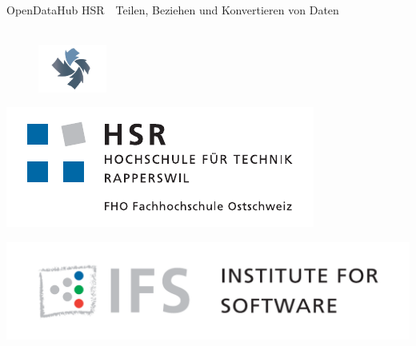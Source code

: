 
\author{
	\rlif \\
	\and
	\chuf \\
	\and
	\fscf \\
}

\clearpage
\begin{titlepage}
	
	\begin{center}
		 \\
		 \\ [25pt]
		\hr{1pt} \\[0.2cm]
		\huge OpenDataHub HSR\ \textendash \ Teilen, Beziehen und Konvertieren von Daten \\
		\hr{1pt} \\[0.2cm]
		
		\begin{figure}[H]
			\centering
			\includegraphics[width=0.2\textwidth]{fig/logo-odh}
		\end{figure}
		
		\begin{minipage}{0.4\textwidth}
			\includegraphics[width=\textwidth]{fig/hsr-logo}
		\end{minipage}
		\begin{minipage}{0.4\textwidth}
			\includegraphics[width=\textwidth]{fig/ifs-logo}
		\end{minipage}
		

\end{center}
\end{titlepage}
